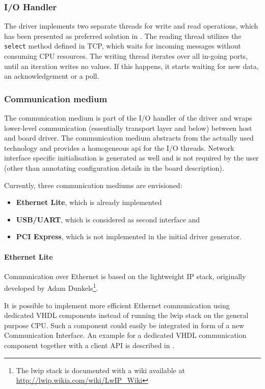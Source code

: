 \documentclass{report}
\begin{document}
\subsubsection{I/O Handler}
The driver implements two separate threads for write and read operations, which has been presented as preferred solution in .
The reading thread utilizes the \texttt{select} method defined in TCP, which waits for incoming messages without consuming CPU resources. The writing thread iterates over all in-going ports, until an iteration writes no values. If this happens, it starts waiting for new data, an acknowledgement or a poll.

\subsubsection{Communication medium}
The communication medium is part of the I/O handler of the driver and wraps lower-level communication (essentially transport layer and below) between host and board driver. The communication medium abstracts from the actually used technology and provides a homogeneous api for the I/O threads. Network interface specific initialisation is generated as well and is not required by the user (other than annotating configuration details in the board description).

Currently, three communication mediums are envisioned:
\begin{itemize} \itemsep1pt \parskip0pt 
\item \textbf{Ethernet Lite}, which is already implemented
\item \textbf{USB/UART}, which is considered as second interface and
\item \textbf{PCI Express}, which is not implemented in the initial driver generator.
\end{itemize}

\paragraph{Ethernet Lite}
Communication over Ethernet is based on the lightweight IP stack, originally developed by Adam Dunkels\footnote{The lwip stack is documented with a wiki available at \url{http://lwip.wikia.com/wiki/LwIP_Wiki}}.

It is possible to implement more efficient Ethernet communication using dedicated VHDL components instead of running the lwip stack on the general purpose CPU. Such a component could easily be integrated in form of a new Communication Interface. An example for a dedicated VHDL communication component together with a client API is described in \cite{alachiotis10, alachiotis12}.
\end{document}
